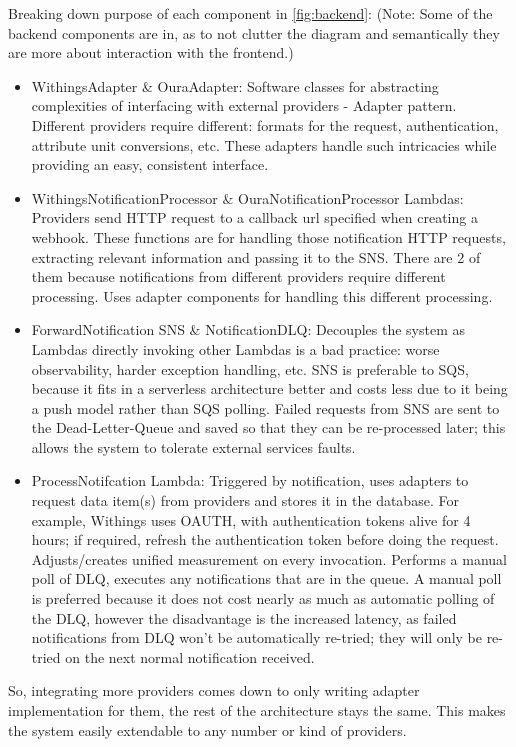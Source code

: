 Breaking down purpose of each component in \ref{fig:backend}: (Note: Some of the backend components are in, as to not clutter the diagram and semantically they are more about interaction with the frontend.)
\begin{itemize}
    \item {WithingsAdapter \& OuraAdapter: Software classes for abstracting complexities of interfacing with external providers - Adapter pattern. Different providers require different: formats for the request, authentication, attribute unit conversions, etc. These adapters handle such intricacies while providing an easy, consistent interface.}
    \item {WithingsNotificationProcessor \& OuraNotificationProcessor Lambdas: Providers send HTTP request to a callback url specified when creating a webhook. These functions are for handling those notification HTTP requests, extracting relevant information and passing it to the SNS. There are 2 of them because notifications from different providers require different processing. Uses adapter components for handling this different processing.}
    \item {ForwardNotification SNS \& NotificationDLQ: Decouples the system as Lambdas directly invoking other Lambdas is a bad practice: worse observability, harder exception handling, etc. SNS is preferable to SQS, because it fits in a serverless architecture better and costs less due to it being a push model rather than SQS polling. Failed requests from SNS are sent to the Dead-Letter-Queue and saved so that they can be re-processed later; this allows the system to tolerate external services faults.}
    \item {ProcessNotifcation Lambda: Triggered by notification, uses adapters to request data item(s) from providers and stores it in the database. For example, Withings uses OAUTH, with authentication tokens alive for 4 hours; if required, refresh the authentication token before doing the request. Adjusts/creates unified measurement on every invocation. Performs a manual poll of DLQ, executes any notifications that are in the queue. A manual poll is preferred because it does not cost nearly as much as automatic polling of the DLQ, however the disadvantage is the increased latency, as failed notifications from DLQ won't be automatically re-tried; they will only be re-tried on the next normal notification received. }
\end{itemize}
So, integrating more providers comes down to only writing adapter implementation for them, the rest of the architecture stays the same. This makes the system easily extendable to any number or kind of providers.
